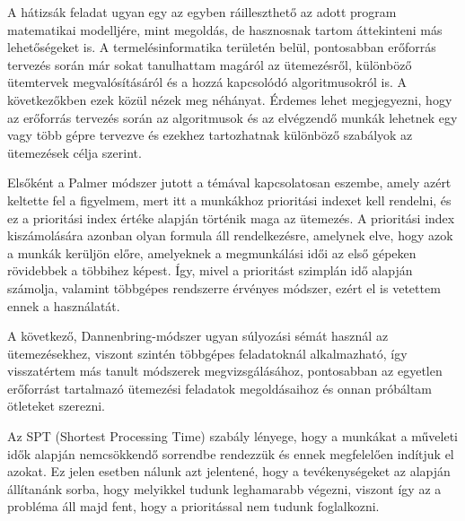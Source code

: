 
A hátizsák feladat ugyan egy az egyben ráilleszthető az adott program matematikai modelljére, mint megoldás, de hasznosnak tartom áttekinteni más lehetőségeket is. A termelésinformatika területén belül, pontosabban erőforrás tervezés során már sokat tanulhattam magáról az ütemezésről, különböző ütemtervek megvalósításáról és a hozzá kapcsolódó algoritmusokról is. A következőkben ezek közül nézek meg néhányat. Érdemes lehet megjegyezni, hogy az erőforrás tervezés során az algoritmusok és az elvégzendő munkák lehetnek egy vagy több gépre tervezve és ezekhez tartozhatnak különböző szabályok az ütemezések célja szerint.



Elsőként a Palmer módszer jutott a témával kapcsolatosan eszembe, amely azért keltette fel a figyelmem, mert itt a munkákhoz prioritási indexet kell rendelni, és ez a prioritási index értéke alapján történik maga az ütemezés. A prioritási index kiszámolására azonban olyan formula áll rendelkezésre, amelynek elve, hogy azok a munkák kerüljön előre, amelyeknek a megmunkálási idői az első gépeken rövidebbek a többihez képest. Így, mivel a prioritást szimplán idő alapján számolja, valamint többgépes rendszerre érvényes módszer, ezért el is vetettem ennek a használatát.



A következő, Dannenbring-módszer ugyan súlyozási sémát használ az ütemezésekhez, viszont szintén többgépes feladatoknál alkalmazható, így visszatértem más tanult módszerek megvizsgálásához, pontosabban az egyetlen erőforrást tartalmazó ütemezési feladatok megoldásaihoz és onnan próbáltam ötleteket szerezni.



Az SPT (Shortest Processing Time) szabály lényege, hogy a munkákat a műveleti idők alapján nemcsökkendő sorrendbe rendezzük és ennek megfelelően indítjuk el azokat. Ez jelen esetben nálunk azt jelentené, hogy a tevékenységeket az alapján állítanánk sorba, hogy melyikkel tudunk leghamarabb végezni, viszont így az a probléma áll majd fent, hogy a prioritással nem tudunk foglalkozni.



